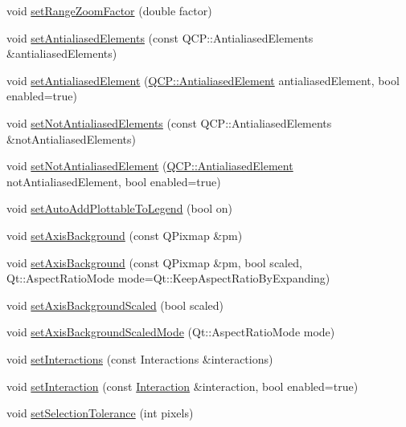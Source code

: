 \begin{DoxyCompactItemize}
\item 
void \hyperlink{classQCustomPlot_abc0e662d15d41f7262a440818c6885d1}{set\-Range\-Zoom\-Factor} (double factor)
\item 
void \hyperlink{classQCustomPlot_af6f91e5eab1be85f67c556e98c3745e8}{set\-Antialiased\-Elements} (const Q\-C\-P\-::\-Antialiased\-Elements \&antialiased\-Elements)
\item 
void \hyperlink{classQCustomPlot_aeef813bcf7efab8e765f9f87ec454691}{set\-Antialiased\-Element} (\hyperlink{namespaceQCP_ae55dbe315d41fe80f29ba88100843a0c}{Q\-C\-P\-::\-Antialiased\-Element} antialiased\-Element, bool enabled=true)
\item 
void \hyperlink{classQCustomPlot_ae10d685b5eabea2999fb8775ca173c24}{set\-Not\-Antialiased\-Elements} (const Q\-C\-P\-::\-Antialiased\-Elements \&not\-Antialiased\-Elements)
\item 
void \hyperlink{classQCustomPlot_afc657938a707c890e449ae89203a076d}{set\-Not\-Antialiased\-Element} (\hyperlink{namespaceQCP_ae55dbe315d41fe80f29ba88100843a0c}{Q\-C\-P\-::\-Antialiased\-Element} not\-Antialiased\-Element, bool enabled=true)
\item 
void \hyperlink{classQCustomPlot_ad8858410c2db47b7104040a3aa61c3fc}{set\-Auto\-Add\-Plottable\-To\-Legend} (bool on)
\item 
void \hyperlink{classQCustomPlot_a6e61739de7485e99171c0fd5a57e27aa}{set\-Axis\-Background} (const Q\-Pixmap \&pm)
\item 
void \hyperlink{classQCustomPlot_a010330bf3686716b9f7d643b3f5205db}{set\-Axis\-Background} (const Q\-Pixmap \&pm, bool scaled, Qt\-::\-Aspect\-Ratio\-Mode mode=Qt\-::\-Keep\-Aspect\-Ratio\-By\-Expanding)
\item 
void \hyperlink{classQCustomPlot_a55ad8c13d7db8b5c2f15d694773a43a3}{set\-Axis\-Background\-Scaled} (bool scaled)
\item 
void \hyperlink{classQCustomPlot_a82920d0db6cc36214dc4a9dfe386d1a1}{set\-Axis\-Background\-Scaled\-Mode} (Qt\-::\-Aspect\-Ratio\-Mode mode)
\item 
void \hyperlink{classQCustomPlot_add9cc886ff5257f64fb4117cf6c135fe}{set\-Interactions} (const Interactions \&interactions)
\item 
void \hyperlink{classQCustomPlot_a14963a1683cfd7621e266f047f40bd8f}{set\-Interaction} (const \hyperlink{classQCustomPlot_acc82d021129b61e550e36747d2e76d3a}{Interaction} \&interaction, bool enabled=true)
\item 
void \hyperlink{classQCustomPlot_a4dc31241d7b09680950e19e5f971ed93}{set\-Selection\-Tolerance} (int pixels)

\end{DoxyCompactItemize}
